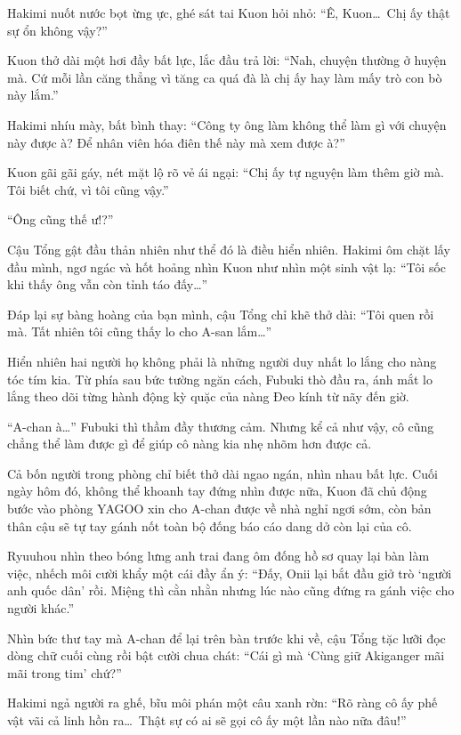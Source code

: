 \documentclass[../main.tex]{subfiles}
\begin{document}
Hakimi nuốt nước bọt ừng ực, ghé sát tai Kuon hỏi nhỏ: ``Ê, Kuon\dots\ Chị ấy thật sự ổn không vậy?''

Kuon thở dài một hơi đầy bất lực, lắc đầu trả lời: ``Nah, chuyện thường ở huyện mà. Cứ mỗi lần căng thẳng vì tăng ca quá đà là chị ấy hay làm mấy trò con bò này lắm.''

Hakimi nhíu mày, bất bình thay: ``Công ty ông làm không thể làm gì với chuyện này được à? Để nhân viên hóa điên thế này mà xem được à?''

Kuon gãi gãi gáy, nét mặt lộ rõ vẻ ái ngại: ``Chị ấy tự nguyện làm thêm giờ mà. Tôi biết chứ, vì tôi cũng vậy.''

``Ông cũng thế ư!?''

Cậu Tổng gật đầu thản nhiên như thể đó là điều hiển nhiên. Hakimi ôm chặt lấy đầu mình, ngơ ngác và hốt hoảng nhìn Kuon như nhìn một sinh vật lạ: ``Tôi sốc khi thấy ông vẫn còn tỉnh táo đấy\dots''

Đáp lại sự bàng hoàng của bạn mình, cậu Tổng chỉ khẽ thở dài: ``Tôi quen rồi mà. Tất nhiên tôi cũng thấy lo cho A-san lắm\dots''

Hiển nhiên hai người họ không phải là những người duy nhất lo lắng cho nàng tóc tím kia. Từ phía sau bức tường ngăn cách, Fubuki thò đầu ra, ánh mắt lo lắng theo dõi từng hành động kỳ quặc của nàng Đeo kính từ nãy đến giờ.


``A-chan à\dots'' Fubuki thì thầm đầy thương cảm. Nhưng kể cả như vậy, cô cũng chẳng thể làm được gì để giúp cô nàng kia nhẹ nhõm hơn được cả.

Cả bốn người trong phòng chỉ biết thở dài ngao ngán, nhìn nhau bất lực. Cuối ngày hôm đó, không thể khoanh tay đứng nhìn được nữa, Kuon đã chủ động bước vào phòng YAGOO xin cho A-chan được về nhà nghỉ ngơi sớm, còn bản thân cậu sẽ tự tay gánh nốt toàn bộ đống báo cáo dang dở còn lại của cô.

Ryuuhou nhìn theo bóng lưng anh trai đang ôm đống hồ sơ quay lại bàn làm việc, nhếch môi cười khẩy một cái đầy ẩn ý: ``Đấy, Onii lại bắt đầu giở trò `người anh quốc dân' rồi. Miệng thì cằn nhằn nhưng lúc nào cũng đứng ra gánh việc cho người khác.''

Nhìn bức thư tay mà A-chan để lại trên bàn trước khi về, cậu Tổng tặc lưỡi đọc dòng chữ cuối cùng rồi bật cười chua chát: ``Cái gì mà `Cùng giữ Akiganger mãi mãi trong tim' chứ?''

Hakimi ngả người ra ghế, bĩu môi phán một câu xanh rờn: ``Rõ ràng cô ấy phế vật vãi cả linh hồn ra\dots\ Thật sự có ai sẽ gọi cô ấy một lần nào nữa đâu!''
\end{document}
